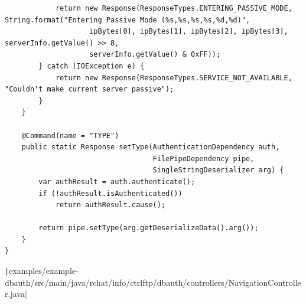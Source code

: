 \documentclass[a4paper,14pt]{extarticle}
\begin{document}
\begin{verbatim}
            return new Response(ResponseTypes.ENTERING_PASSIVE_MODE, String.format("Entering Passive Mode (%s,%s,%s,%s,%d,%d)",
                    ipBytes[0], ipBytes[1], ipBytes[2], ipBytes[3], serverInfo.getValue() >> 8,
                    serverInfo.getValue() & 0xFF));
        } catch (IOException e) {
            return new Response(ResponseTypes.SERVICE_NOT_AVAILABLE, "Couldn't make current server passive");
        }
    }

    @Command(name = "TYPE")
    public static Response setType(AuthenticationDependency auth,
                                   FilePipeDependency pipe,
                                   SingleStringDeserializer arg) {
        var authResult = auth.authenticate();
        if (!authResult.isAuthenticated())
            return authResult.cause();

        return pipe.setType(arg.getDeserializeData().arg());
    }
}
\end{verbatim}
\texttt|examples/example-dbauth/src/main/java/rchat/info/ctrlftp/dbauth/controllers/NavigationController.java|
\end{document}
